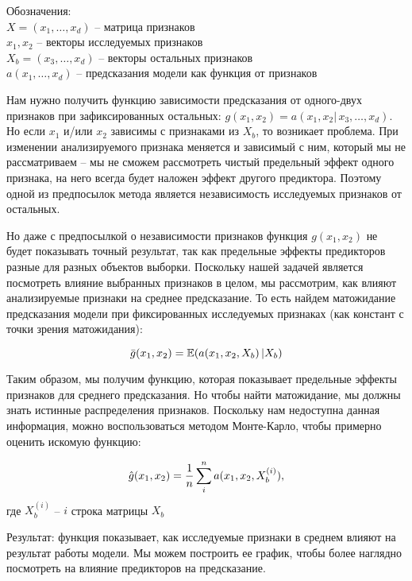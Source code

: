 Обозначения:\\
$X = (x_1, \ldots, x_d)$ -- матрица признаков\\
$x_1, x_2$ -- векторы исследуемых признаков\\
$X_b = (x_3, \ldots, x_d)$ -- векторы остальных признаков\\
$a(x_1, \ldots, x_d)$ -- предсказания модели как функция от признаков

Нам нужно получить функцию зависимости предсказания от одного-двух признаков при зафиксированных остальных: $g(x_1, x_2) = a(x_1, x_2 | \, x_3, \ldots, x_d)$. Но если $x_1$ и/или $x_2$ зависимы с признаками из $X_b$, то возникает проблема. При изменении анализируемого признака меняется и зависимый с ним, который мы не рассматриваем -- мы не сможем рассмотреть чистый предельный эффект одного признака, на него всегда будет наложен эффект другого предиктора. Поэтому одной из предпосылок метода является независимость исследуемых признаков от остальных.

Но даже с предпосылкой о независимости признаков функция $g(x_1, x_2)$ не будет показывать точный результат, так как предельные эффекты предикторов разные для разных объектов выборки. Поскольку нашей задачей является посмотреть влияние выбранных признаков в целом, мы рассмотрим, как влияют анализируемые признаки на среднее предсказание. То есть найдем матожидание предсказания модели при фиксированных исследуемых признаках (как констант с точки зрения матожидания):

\[
\bar{g}(x_1, x_2) = \mathbb{E}(a(x_1, x_2, X_b) \, | X_b)
\]

Таким образом, мы получим функцию, которая показывает предельные эффекты признаков для среднего предсказания. Но чтобы найти матожидание, мы должны знать истинные распределения признаков. Поскольку нам недоступна данная информация, можно воспользоваться методом Монте-Карло, чтобы примерно оценить искомую функцию:

\[
\hat{g}(x_1, x_2) = \frac{1}{n} \sum\limits_i^n a(x_1, x_2, X_b^{(i)}),
\]
где $X_b^{(i)}$ -- $i$ строка матрицы $X_b$

Результат: функция показывает, как исследуемые признаки в среднем влияют на результат работы модели. Мы можем построить ее график, чтобы более наглядно посмотреть на влияние предикторов на предсказание.





